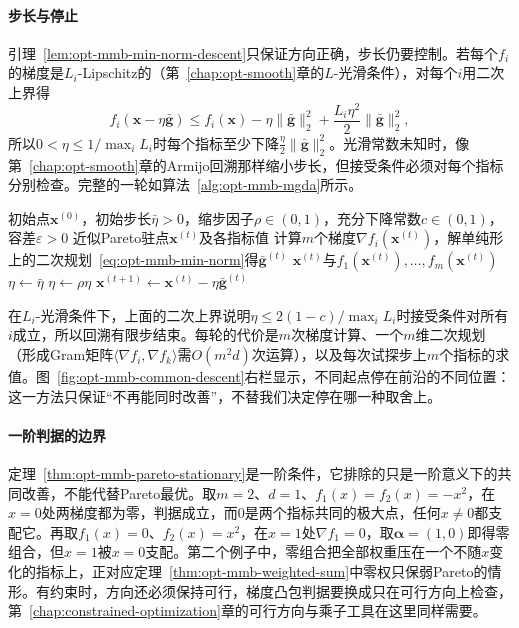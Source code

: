 \paragraph{步长与停止}
引理~\ref{lem:opt-mmb-min-norm-descent}只保证方向正确，步长仍要控制。若每个$f_i$的梯度是$L_i$-Lipschitz的（第~\ref{chap:opt-smooth}章的$L$-光滑条件），对每个$i$用二次上界得
\[
f_i(\bm x-\eta\bar{\bm g})\leq f_i(\bm x)-\eta\lVert\bar{\bm g}\rVert_2^2+\frac{L_i\eta^2}{2}\lVert\bar{\bm g}\rVert_2^2,
\]
所以$0<\eta\leq1/\max_iL_i$时每个指标至少下降$\frac{\eta}{2}\lVert\bar{\bm g}\rVert_2^2$。光滑常数未知时，像第~\ref{chap:opt-smooth}章的Armijo回溯那样缩小步长，但接受条件必须对每个指标分别检查。完整的一轮如算法~\ref{alg:opt-mmb-mgda}所示。

\begin{algorithm}[带回溯的共同下降法]
\label{alg:opt-mmb-mgda}
\begin{algorithmic}[1]
\Require 初始点$\bm x^{(0)}$，初始步长$\bar\eta>0$，缩步因子$\rho\in(0,1)$，充分下降常数$c\in(0,1)$，容差$\varepsilon>0$
\Ensure 近似Pareto驻点$\bm x^{(t)}$及各指标值
  \State 计算$m$个梯度$\nabla f_i(\bm x^{(t)})$，解单纯形上的二次规划~\eqref{eq:opt-mmb-min-norm}得$\bar{\bm g}^{(t)}$
    \State \Return $\bm x^{(t)}$与$f_1(\bm x^{(t)}),\dots,f_m(\bm x^{(t)})$
  \EndIf
  \State $\eta\gets\bar\eta$
    \State $\eta\gets\rho\eta$
  \EndWhile
  \State $\bm x^{(t+1)}\gets\bm x^{(t)}-\eta\bar{\bm g}^{(t)}$
\EndFor
\end{algorithmic}
\end{algorithm}

在$L_i$-光滑条件下，上面的二次上界说明$\eta\leq2(1-c)/\max_iL_i$时接受条件对所有$i$成立，所以回溯有限步结束。每轮的代价是$m$次梯度计算、一个$m$维二次规划（形成Gram矩阵$\langle\nabla f_i,\nabla f_k\rangle$需$O(m^2d)$次运算），以及每次试探步上$m$个指标的求值。图~\ref{fig:opt-mmb-common-descent}右栏显示，不同起点停在前沿的不同位置：这一方法只保证“不再能同时改善”，不替我们决定停在哪一种取舍上。

\paragraph{一阶判据的边界}
定理~\ref{thm:opt-mmb-pareto-stationary}是一阶条件，它排除的只是一阶意义下的共同改善，不能代替Pareto最优。取$m=2$、$d=1$、$f_1(x)=f_2(x)=-x^2$，在$x=0$处两梯度都为零，判据成立，而$0$是两个指标共同的极大点，任何$x\neq0$都支配它。再取$f_1(x)=0$、$f_2(x)=x^2$，在$x=1$处$\nabla f_1=0$，取$\bm\alpha=(1,0)$即得零组合，但$x=1$被$x=0$支配。第二个例子中，零组合把全部权重压在一个不随$x$变化的指标上，正对应定理~\ref{thm:opt-mmb-weighted-sum}中零权只保弱Pareto的情形。有约束时，方向还必须保持可行，梯度凸包判据要换成只在可行方向上检查，第~\ref{chap:constrained-optimization}章的可行方向与乘子工具在这里同样需要。

